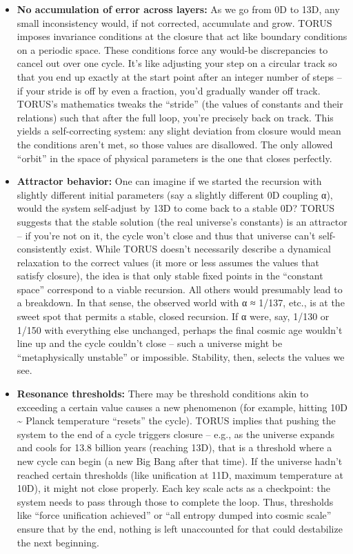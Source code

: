 \documentclass[
]{article}
\begin{document}
\begin{itemize}
\item
  \textbf{No accumulation of error across layers:} As we go from 0D to
  13D, any small inconsistency would, if not corrected, accumulate and
  grow. TORUS imposes invariance conditions at the closure that act like
  boundary conditions on a periodic space\hspace{0pt}. These conditions
  force any would-be discrepancies to cancel out over one cycle. It's
  like adjusting your step on a circular track so that you end up
  exactly at the start point after an integer number of steps -- if your
  stride is off by even a fraction, you'd gradually wander off track.
  TORUS's mathematics tweaks the ``stride'' (the values of constants and
  their relations) such that after the full loop, you're precisely back
  on track. This yields a self-correcting system: any slight deviation
  from closure would mean the conditions aren't met, so those values are
  disallowed. The only allowed ``orbit'' in the space of physical
  parameters is the one that closes perfectly.
\item
  \textbf{Attractor behavior:} One can imagine if we started the
  recursion with slightly different initial parameters (say a slightly
  different 0D coupling α), would the system self-adjust by 13D to come
  back to a stable 0D? TORUS suggests that the stable solution (the real
  universe's constants) is an attractor -- if you're not on it, the
  cycle won't close and thus that universe can't self-consistently
  exist. While TORUS doesn't necessarily describe a dynamical relaxation
  to the correct values (it more or less assumes the values that satisfy
  closure), the idea is that only stable fixed points in the ``constant
  space'' correspond to a viable recursion. All others would presumably
  lead to a breakdown. In that sense, the observed world with α ≈ 1/137,
  etc., is at the sweet spot that permits a stable, closed recursion. If
  α were, say, 1/130 or 1/150 with everything else unchanged, perhaps
  the final cosmic age wouldn't line up and the cycle couldn't close --
  such a universe might be ``metaphysically unstable'' or impossible.
  Stability, then, selects the values we see.
\item
  \textbf{Resonance thresholds:} There may be threshold conditions akin
  to exceeding a certain value causes a new phenomenon (for example,
  hitting 10D \textasciitilde{} Planck temperature ``resets'' the
  cycle). TORUS implies that pushing the system to the end of a cycle
  triggers closure -- e.g., as the universe expands and cools for 13.8
  billion years (reaching 13D), that is a threshold where a new cycle
  can begin (a new Big Bang after that time). If the universe hadn't
  reached certain thresholds (like unification at 11D, maximum
  temperature at 10D), it might not close properly. Each key scale acts
  as a checkpoint: the system needs to pass through those to complete
  the loop. Thus, thresholds like ``force unification achieved'' or
  ``all entropy dumped into cosmic scale'' ensure that by the end,
  nothing is left unaccounted for that could destabilize the next
  beginning.
\end{itemize}
\end{document}
